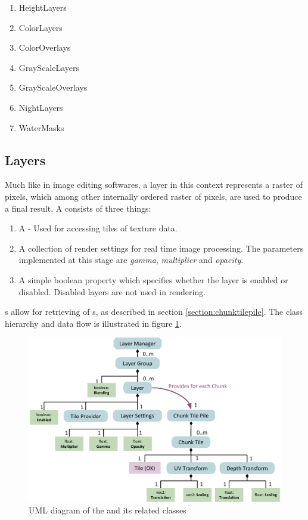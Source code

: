 \begin{enumerate}
\item HeightLayers
\item ColorLayers
\item ColorOverlays
\item GrayScaleLayers
\item GrayScaleOverlays
\item NightLayers
\item WaterMasks
\end{enumerate}

\subsection{Layers}
Much like in image editing softwares, a layer in this context represents a raster of pixels, which among other internally ordered raster of pixels, are used to produce a final result. A  consists of three things:

\begin{enumerate}
\item A  - Used for accessing tiles of texture data.
\item A collection of render settings for real time image processing. The parameters implemented at this stage are \emph{gamma}, \emph{multiplier} and \emph{opacity}.
\item A simple boolean property which specifies whether the layer is enabled or disabled. Disabled layers are not used in rendering.
\end{enumerate}

s allow for retrieving of s, as described in section \ref{section:chunktilepile}. The class hierarchy and data flow is illustrated in figure \ref{fig:layermanager}.

\begin{figure}[htbp]
    \centering
    \includegraphics[width=\textwidth]{figures/implementation/layers/layermanager.pdf}
    \caption{UML diagram of the  and its related classes}
    \label{fig:layermanager}
\end{figure}

